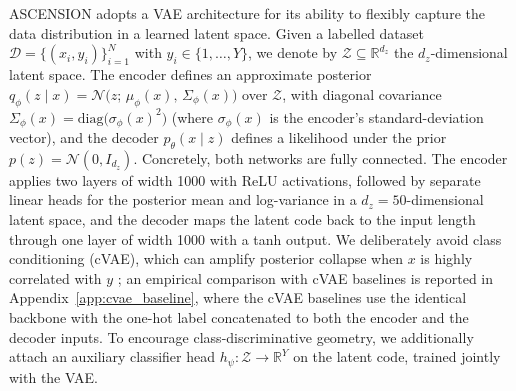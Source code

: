 ASCENSION adopts a VAE architecture for its ability to flexibly
capture the data distribution in a learned latent space. Given a
labelled dataset $\mathcal{D} = \{(x_i, y_i)\}_{i=1}^{N}$ with
$y_i \in \{1, \ldots, Y\}$, we denote by
$\mathcal{Z} \subseteq \mathbb{R}^{d_z}$ the $d_z$-dimensional
latent space. The encoder defines an approximate posterior
$q_\phi(z \mid x) = \mathcal{N}\bigl(z;\,\mu_\phi(x),\,\Sigma_\phi(x)\bigr)$
over $\mathcal{Z}$, with diagonal covariance
$\Sigma_\phi(x) = \mathrm{diag}\bigl(\sigma_\phi(x)^{2}\bigr)$
(where $\sigma_\phi(x)$ is the encoder's standard-deviation
vector),
and the decoder $p_\theta(x \mid z)$ defines a likelihood under
the prior $p(z) = \mathcal{N}(0, I_{d_z})$.
Concretely, both networks are fully connected. The encoder
applies two layers of width 1000 with ReLU activations, followed
by separate linear heads for the posterior mean and log-variance
in a $d_z = 50$-dimensional latent space, and the decoder maps
the latent code back to the input length through one layer of
width 1000 with a tanh output.
We deliberately avoid
class conditioning (cVAE), which can amplify posterior collapse
when $x$ is highly correlated with $y$
\citep{dang2023posteriorcollapse}; an empirical comparison with
cVAE baselines is reported in
Appendix~\ref{app:cvae_baseline}, where the cVAE baselines use
the identical backbone with the one-hot label concatenated to
both the encoder and the decoder inputs. To encourage class-discriminative
geometry, we additionally attach an auxiliary classifier head
$h_\psi : \mathcal{Z} \to \mathbb{R}^{Y}$ on the latent code,
trained jointly with the VAE.


